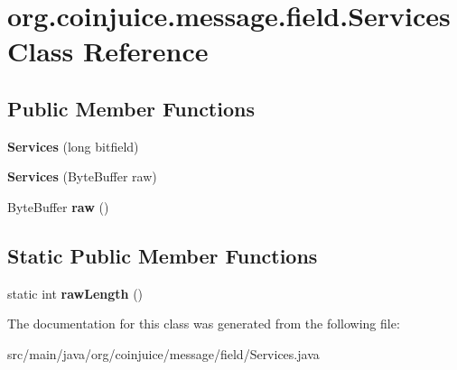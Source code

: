 \hypertarget{classorg_1_1coinjuice_1_1message_1_1field_1_1_services}{\section{org.\-coinjuice.\-message.\-field.\-Services Class Reference}
\label{classorg_1_1coinjuice_1_1message_1_1field_1_1_services}
}
\subsection*{Public Member Functions}
\begin{DoxyCompactItemize}
\item 
\hypertarget{classorg_1_1coinjuice_1_1message_1_1field_1_1_services_ad0ea4f0a60be9419467ac16f99757684}{{\bfseries Services} (long bitfield)}\label{classorg_1_1coinjuice_1_1message_1_1field_1_1_services_ad0ea4f0a60be9419467ac16f99757684}

\item 
\hypertarget{classorg_1_1coinjuice_1_1message_1_1field_1_1_services_a105fb818ee4f6797606603fcd89fcb5a}{{\bfseries Services} (Byte\-Buffer raw)}\label{classorg_1_1coinjuice_1_1message_1_1field_1_1_services_a105fb818ee4f6797606603fcd89fcb5a}

\item 
\hypertarget{classorg_1_1coinjuice_1_1message_1_1field_1_1_services_ab6e4615f3c3d2e2fd318c7a723ded877}{Byte\-Buffer {\bfseries raw} ()}\label{classorg_1_1coinjuice_1_1message_1_1field_1_1_services_ab6e4615f3c3d2e2fd318c7a723ded877}

\end{DoxyCompactItemize}
\subsection*{Static Public Member Functions}
\begin{DoxyCompactItemize}
\item 
\hypertarget{classorg_1_1coinjuice_1_1message_1_1field_1_1_services_a8f16b3eb0a01d2ab8c66414919ea7c14}{static int {\bfseries raw\-Length} ()}\label{classorg_1_1coinjuice_1_1message_1_1field_1_1_services_a8f16b3eb0a01d2ab8c66414919ea7c14}

\end{DoxyCompactItemize}


The documentation for this class was generated from the following file\-:\begin{DoxyCompactItemize}
\item 
src/main/java/org/coinjuice/message/field/Services.\-java\end{DoxyCompactItemize}
